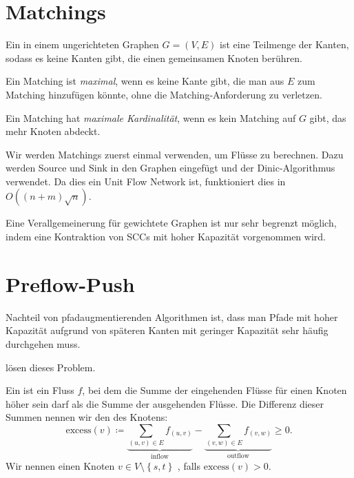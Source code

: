 \section{Matchings}

Ein  in einem ungerichteten Graphen \( G = (V, E) \) ist eine Teilmenge der Kanten, sodass es keine Kanten gibt, die einen gemeinsamen Knoten berühren.

Ein Matching ist \emph{maximal}, wenn es keine Kante gibt, die man aus \( E \) zum Matching hinzufügen könnte, ohne die Matching-Anforderung zu verletzen.

Ein Matching hat \emph{maximale Kardinalität}, wenn es kein Matching auf \( G \) gibt, das mehr Knoten abdeckt.

Wir werden Matchings zuerst einmal verwenden, um Flüsse zu berechnen. Dazu werden Source und Sink in den Graphen eingefügt und der Dinic-Algorithmus verwendet. Da dies ein Unit Flow Network ist, funktioniert dies in $O((n+m)\sqrt{n})$.

Eine Verallgemeinerung für gewichtete Graphen ist nur sehr begrenzt möglich, indem eine Kontraktion von SCCs mit hoher Kapazität vorgenommen wird. 

\section{Preflow-Push}

Nachteil von pfadaugmentierenden Algorithmen ist, dass man Pfade mit hoher Kapazität aufgrund von späteren Kanten mit geringer Kapazität sehr häufig durchgehen muss.

 lösen dieses Problem.

\begin{definition}[Preflow]
  Ein  ist ein Fluss \( f \), bei dem die Summe der eingehenden Flüsse für einen Knoten höher sein darf als die Summe der ausgehenden Flüsse. Die Differenz dieser Summen nennen wir den  des Knotens:
  \begin{equation*}
    \text{excess}(v) \coloneqq \underbrace{\sum_{(u,v) \in E} f_{(u,v)}}_{\text{inflow}} - \underbrace{\sum_{(v,w) \in E} f_{(v,w)}}_{\text{outflow}} \geq 0\text{.}
  \end{equation*}
  Wir nennen einen Knoten \( v \in V \setminus \left \{ s, t \right \} \) , falls \( \text{excess}(v) > 0 \).
\end{definition}

